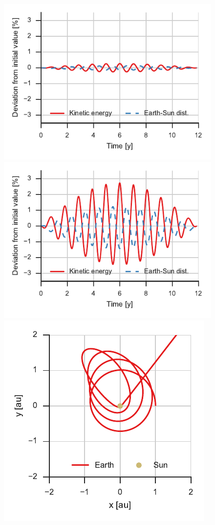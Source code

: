 \documentclass[aps,prc,reprint,nobalancelastpage]{revtex4-1}
\begin{document}
        \begin{figure}
            \includegraphics{jupiter_devs_1x.pdf}
            \includegraphics{jupiter_devs_10x.pdf}
            \includegraphics{jupiter_1000x.pdf}

\end{figure}
\end{document}
